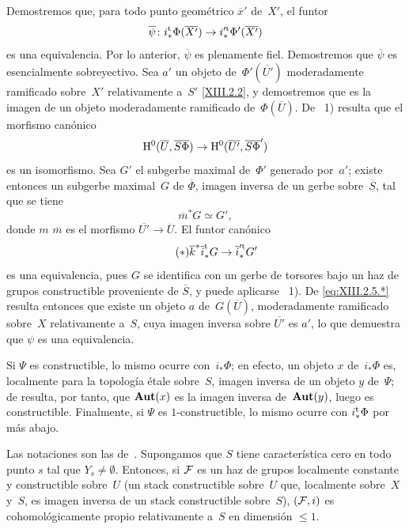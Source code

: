 Demostremos
que, para todo punto geométrico $\overline{x}'$ de~$X'$, el
funtor
$$
\overline{\psi}\colon
i^{\tame}_*\Phi(\overline{X'})
\to i_*^{\prime\tame}\Phi'(\overline{X'})
$$
es una equivalencia. Por lo anterior,
$\overline{\psi}$ es plenamente fiel. Demostremos que
$\overline{\psi}$ es esencialmente sobreyectivo. Sea $a'$ un
objeto de~$\Phi'(\overline{U'})$ moderadamente
ramificado sobre~$X'$ relativamente a~$S'$ \eqref{XIII.2.2}, y
demostremos que es la imagen de un objeto moderadamente
ramificado de~$\Phi(\overline{U})$. De~
1) resulta que el morfismo canónico
$$
\H^0(\overline{U},\overline{S}\overline{\Phi})\to
\H^0(\overline{U'},\overline{S}\overline{\Phi}')
$$
es un isomorfismo. Sea $G'$ el subgerbe maximal de~$\Phi'$
generado por~$a'$; existe entonces un subgerbe maximal~$G$ de
$\overline{\Phi}$, imagen inversa de un gerbe sobre~$\overline{S}$, tal
que se tiene
$$
\overline{m}^*G\simeq G',
$$
donde
{$m$}
{$\overline{m}$}
es el morfismo $\overline{U'}\to
\overline{U}$. El funtor canónico
\begin{equation*}
\label{eq:XIII.2.5.*}
\tag{$*$} {\overline{k}^*\overline{i}_*^{\tame}G\to
\overline{i}_*^{\prime\tame}G'}
\end{equation*}
es una equivalencia, pues $G$ se identifica con un gerbe de
torsores bajo un haz de grupos constructible proveniente de
$\overline{S}$, y puede aplicarse ~1). De
\eqref{eq:XIII.2.5.*} resulta entonces que existe un
objeto $a$ de~$G(\overline{U})$, moderadamente
ramificado sobre~$X$ relativamente a~$S$, cuya imagen inversa sobre
$\overline{U'}$ es $a'$, lo que demuestra que $\psi$ es una
equivalencia.

Si $\Psi$ es constructible, lo mismo ocurre con~$i_*\Phi$; en
efecto, un objeto $x$ de~$i_*\Phi$ es, localmente para la topología
étale sobre~$S$, imagen inversa de un objeto $y$ de~$\Psi$; de
 resulta, por tanto, que $\SheafAut (x)$ es
la imagen inversa de~$\SheafAut (y)$, luego es constructible. Finalmente, si
$\Psi$ es $1$-constructible, lo mismo ocurre con
$i^{\tame}_*\Phi$ por~ más abajo.

\begin{corollaire}
\label{XIII.2.6}
Las
notaciones son las de~. Supongamos que $S$ tiene
característica cero en todo punto $s$ tal que $Y_s\neq
\emptyset.$ Entonces, si $\cal{ F}$ es un haz de grupos localmente
constante y constructible sobre~$U$ (\resp un stack constructible
sobre~$U$ que, localmente sobre~$X$ y~$S$, es imagen inversa de un
stack constructible sobre~$S$), $(\cal{ F},i)$ es cohomológicamente
propio relativamente a~$S$ en dimensión $\leq 1.$
\end{corollaire}

